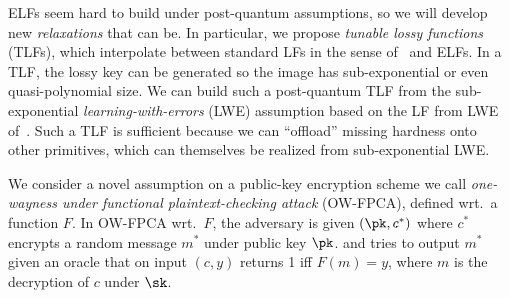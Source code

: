   ELFs seem hard to build under  post-quantum assumptions, so we will develop new \emph{relaxations} that can be. In particular, we propose \emph{tunable lossy functions} (TLFs), which  interpolate between  standard LFs in the sense of~\cite{JACM:PeiWat11} and ELFs. In a TLF, the lossy key can be generated so the image has sub-exponential or even quasi-polynomial size. We can build such a post-quantum TLF from  the sub-exponential  \emph{learning-with-errors} (LWE) assumption based on the LF from LWE of~\cite{JACM:PeiWat11}. Such a TLF is   sufficient because we can ``offload'' missing hardness onto other primitives, which can themselves be realized from sub-exponential LWE.  %

We consider a novel assumption on a public-key encryption scheme  we call \emph{one-wayness under functional plaintext-checking attack} (OW-FPCA), defined wrt.~a function  $F$. In OW-FPCA wrt.~$F$, the adversary is given $(\pk, c^*)$ where $c^*$ encrypts a random message $m^*$ under public key $\pk$. and tries to output $m^*$ given an oracle that on input $(c,y)$ returns 1 iff $F(m) = y$, where $m$ is the decryption of $c$ under $\sk$.

